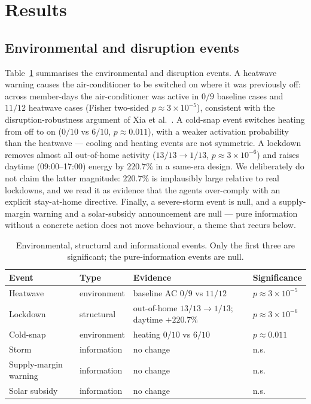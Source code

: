\documentclass[11pt]{article}
\begin{document}
\section{Results}
\label{sec:results}

\subsection{Environmental and disruption events}
Table~\ref{tab:events} summarises the environmental and disruption events. A heatwave warning causes the
air-conditioner to be switched on where it was previously off: across member-days the air-conditioner was
active in $0/9$ baseline cases and $11/12$ heatwave cases (Fisher two-sided $p\approx3\times10^{-5}$),
consistent with the disruption-robustness argument of Xia et al.\ \cite{xia2026}. A cold-snap event
switches heating from off to on ($0/10$ vs $6/10$, $p\approx0.011$), with a weaker activation probability
than the heatwave --- cooling and heating events are not symmetric. A lockdown removes almost all
out-of-home activity ($13/13\rightarrow1/13$, $p\approx3\times10^{-6}$) and raises daytime (09:00--17:00)
energy by $220.7\%$ in a same-era design. We deliberately do not claim the latter magnitude: $220.7\%$ is
implausibly large relative to real lockdowns, and we read it as evidence that the agents over-comply with
an explicit stay-at-home directive. Finally, a severe-storm event is null, and a supply-margin warning
and a solar-subsidy announcement are null --- pure information without a concrete action does not move
behaviour, a theme that recurs below.

\begin{table}[ht]
\centering\small
\begin{tabular}{llll}
\toprule
Event & Type & Evidence & Significance \\
\midrule
Heatwave & environment & baseline AC $0/9$ vs $11/12$ & $p\approx3\times10^{-5}$ \\
Lockdown & structural & out-of-home $13/13\rightarrow1/13$; daytime $+220.7\%$ & $p\approx3\times10^{-6}$ \\
Cold-snap & environment & heating $0/10$ vs $6/10$ & $p\approx0.011$ \\
Storm & information & no change & n.s. \\
Supply-margin warning & information & no change & n.s. \\
Solar subsidy & information & no change & n.s. \\
\bottomrule
\end{tabular}
\caption{Environmental, structural and informational events. Only the first three are significant; the
pure-information events are null.}
\label{tab:events}
\end{table}
\end{document}
